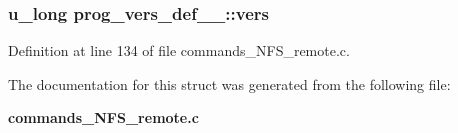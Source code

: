 \subsubsection[{vers}]{\setlength{\rightskip}{0pt plus 5cm}u\_\-long {\bf prog\_\-vers\_\-def\_\-\_\-::vers}}\label{structprog__vers__def_____a6d93603ec1877cfa946837bf5be6444f}


Definition at line 134 of file commands\_\-NFS\_\-remote.c.

The documentation for this struct was generated from the following file:\begin{DoxyCompactItemize}
\item 
{\bf commands\_\-NFS\_\-remote.c}\end{DoxyCompactItemize}
